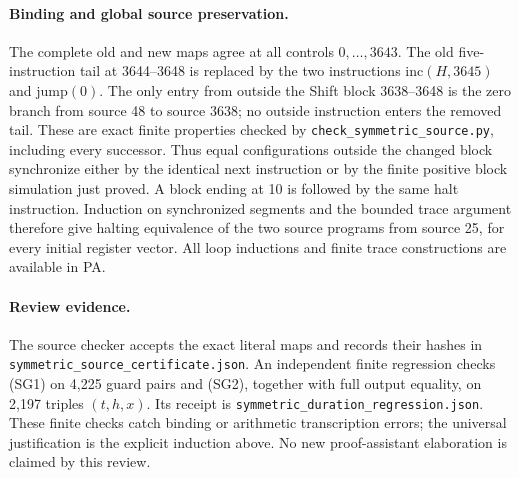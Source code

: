 \paragraph{Binding and global source preservation.}
The complete old and new maps agree at all controls $0,\ldots,3643$.
The old five-instruction tail at 3644--3648 is replaced by the two
instructions $\mathrm{inc}(H,3645)$ and $\mathrm{jump}(0)$.
The only entry from outside the Shift block 3638--3648 is the zero
branch from source 48 to source 3638; no outside instruction enters the
removed tail. These are exact finite properties checked by
\texttt{check\_symmetric\_source.py}, including every successor.
Thus equal configurations outside the changed block synchronize either
by the identical next instruction or by the finite positive block
simulation just proved. A block ending at 10 is followed by the same
halt instruction. Induction on synchronized segments and the bounded
trace argument therefore give halting equivalence of the two source
programs from source 25, for every initial register vector. All loop
inductions and finite trace constructions are available in PA.

\paragraph{Review evidence.}
The source checker accepts the exact literal maps and records their
hashes in \texttt{symmetric\_source\_certificate.json}. An independent
finite regression checks (SG1) on 4,225 guard pairs and (SG2), together
with full output equality, on 2,197 triples $(t,h,x)$. Its receipt is
\texttt{symmetric\_duration\_regression.json}. These finite checks catch
binding or arithmetic transcription errors; the universal justification
is the explicit induction above. No new proof-assistant elaboration is
claimed by this review.
